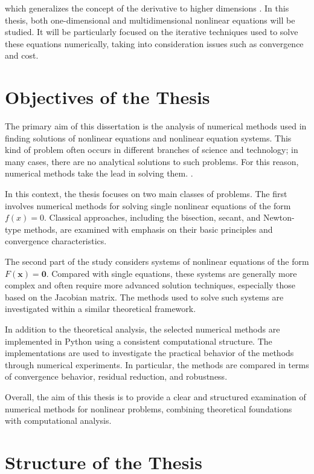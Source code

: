 which generalizes the concept of the derivative to higher dimensions \cite{kelley}.
In this thesis, both one-dimensional and multidimensional nonlinear equations will be studied. It will be particularly focused on the iterative techniques used to solve these equations numerically, taking into consideration issues such as convergence and cost.

\section{Objectives of the Thesis}

The primary aim of this dissertation is the analysis of numerical methods used in finding solutions of nonlinear equations and nonlinear equation systems. This kind of problem often occurs in different branches of science and technology; in many cases, there are no analytical solutions to such problems. For this reason, numerical methods take the lead in solving them. \cite{burden, atkinson}.

In this context, the thesis focuses on two main classes of problems. The first involves numerical methods for solving single nonlinear equations of the form \( f(x) = 0 \). Classical approaches, including the bisection, secant, and Newton-type methods, are examined with emphasis on their basic principles and convergence characteristics.

The second part of the study considers systems of nonlinear equations of the form \( F(\mathbf{x}) = \mathbf{0} \). Compared with single equations, these systems are generally more complex and often require more advanced solution techniques, especially those based on the Jacobian matrix. The methods used to solve such systems are investigated within a similar theoretical framework.

In addition to the theoretical analysis, the selected numerical methods are implemented in Python using a consistent computational structure. The implementations are used to investigate the practical behavior of the methods through numerical experiments. In particular, the methods are compared in terms of convergence behavior, residual reduction, and robustness.

Overall, the aim of this thesis is to provide a clear and structured examination of numerical methods for nonlinear problems, combining theoretical foundations with computational analysis.

\section{Structure of the Thesis}


